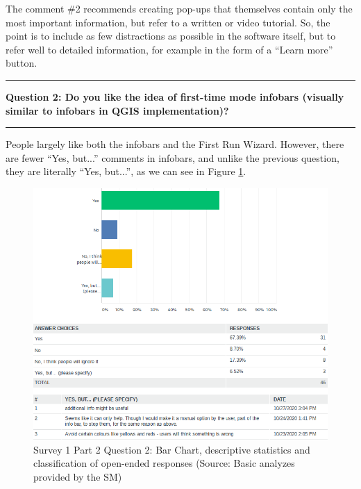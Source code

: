 \documentclass[a4paper,10pt,twoside]{article}
\begin{document}
\noindent The comment \#2 recommends creating pop-ups that themselves
contain only the most important information, but refer to a written
or video tutorial. So, the point is to include as few distractions as
possible in the software itself, but to refer well to detailed
information, for example in the form of a ``Learn more'' button.

\par\noindent\rule{\textwidth}{0.4pt}
\noindent \textbf{Question 2: Do you like the idea of first-time mode infobars (visually similar to infobars in QGIS implementation)?}
\par\noindent\rule{\textwidth}{0.4pt}

\noindent People largely like both the infobars and the First Run Wizard. However, there are fewer ``Yes, but...'' comments in infobars, and unlike the previous question, they are literally ``Yes, but...'', as we can see in Figure \ref{fig:survey1_part2_question2_all}. 

\vspace{0.3cm}
\begin{figure}[hbt!] 
\begin{center}
\includegraphics[width=15.5cm]{../surveys/analyzed_data/survey1_part2_question2_all.png} 
\caption[Survey 1 Part 2 Question 2: Bar Chart, descriptive statistics and classification of open-ended responses]{Survey 1 Part 2 Question 2: Bar Chart, descriptive statistics and classification of  open-ended responses (Source: Basic analyzes provided by the SM)}
\label{fig:survey1_part2_question2_all}
\end{center}
\end{figure}
\end{document}
